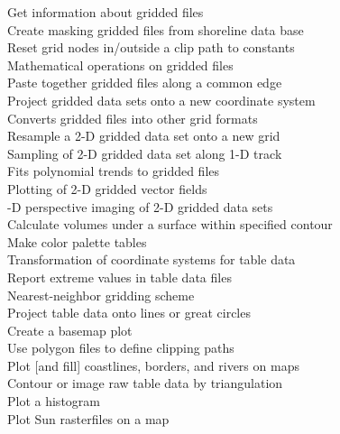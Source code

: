 \begin{tabbing}
	\>	Get information about gridded files \\ 
	\>	Create masking gridded files from shoreline data base \\ 
	\>	Reset grid nodes in/outside a clip path to constants \\ 
	\>	Mathematical operations on gridded files \\ 
	\>	Paste together gridded files along a common edge \\ 
	\>	Project gridded data sets onto a new coordinate system \\ 
	\>	Converts gridded files into other grid formats \\ 
	\>	Resample a 2-D gridded data set onto a new grid \\ 
	\>	Sampling of 2-D gridded data set along 1-D track \\ 
	\>	Fits polynomial trends to gridded files \\ 
	\>	Plotting of 2-D gridded vector fields \\ 
	-D perspective imaging of 2-D gridded data sets \\ 
	\>	Calculate volumes under a surface within specified contour \\ 
	\>	Make color palette tables \\ 
	\>	Transformation of coordinate systems for table data \\ 
	\>	Report extreme values in table data files \\ 
	\>	Nearest-neighbor gridding scheme \\ 
	\>	Project table data onto lines or great circles \\ 
	\>	Create a basemap plot \\ 
	\>	Use polygon files to define clipping paths \\ 
	\>	Plot [and fill] coastlines, borders, and rivers on maps \\ 
	\>	Contour or image raw table data by triangulation \\ 
	\>	Plot a histogram \\ 
	\>	Plot Sun rasterfiles on a map \\ 

\end{tabbing}
